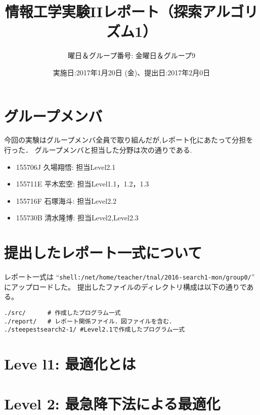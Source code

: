 \documentclass[uplatex,10pt]{jsarticle}
\begin{document}
\title{情報工学実験IIレポート（探索アルゴリズム1）}
\author{曜日＆グループ番号: 金曜日＆グループ9} %
\date{実施日:2017年1月20日 (金)、提出日:2017年2月0日}

\maketitle


\section*{グループメンバ}
今回の実験はグループメンバ全員で取り組んだが,レポート化にあたって分担を行った．
グループメンバと担当した分野は次の通りである.
\begin{itemize}
 \item 155706J 久場翔悟: 担当Level2.1
 \item 155711E 平木宏空: 担当Level1.1，1.2，1.3
 \item 155716F 石塚海斗: 担当Level2.2
 \item 155730B 清水隆博: 担当Level2,Level2.3
\end{itemize}

\section*{提出したレポート一式について}
レポート一式は
``\verb|shell:/net/home/teacher/tnal/2016-search1-mon/group0/|''
にアップロードした。
提出したファイルのディレクトリ構成は以下の通りである。

\vspace{+0.5cm}
\begin{breakbox}
\begin{verbatim}
./src/      # 作成したプログラム一式
./report/   # レポート関係ファイル．図ファイルを含む．
./steepestsearch2-1/ #Level2.1で作成したプログラム一式
\end{verbatim}
\end{breakbox}

\newpage

\section{Leve l1: 最適化とは}




\newpage

\section{Level 2: 最急降下法による最適化}



\end{document}
